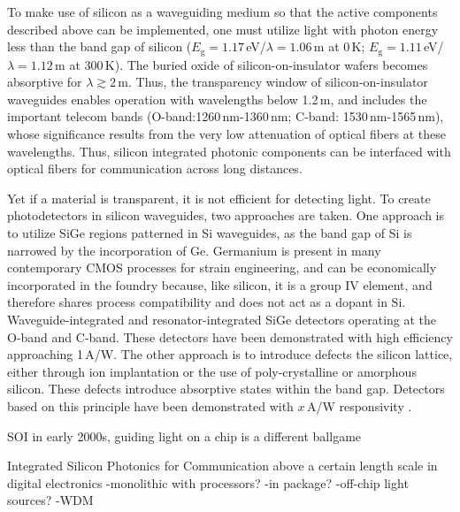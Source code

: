 To make use of silicon as a waveguiding medium so that the active components described above can be implemented, one must utilize light with photon energy less than the band gap of silicon ($E_{\mathrm{g}}=1.17$\,eV/$\lambda = 1.06$\,\textmu m at 0\,K; $E_{\mathrm{g}}=1.11$\,eV/$\lambda = 1.12$\,\textmu m at 300\,K). The buried oxide of silicon-on-insulator wafers becomes absorptive for $\lambda \gtrsim 2$\,\textmu m. Thus, the transparency window of silicon-on-insulator waveguides enables operation with wavelengths below 1.2\,\textmu m, and includes the important telecom bands (O-band:1260\,nm-1360\,nm; C-band: 1530\,nm-1565\,nm), whose significance results from the very low attenuation of optical fibers at these wavelengths. Thus, silicon integrated photonic components can be interfaced with optical fibers for communication across long distances. 

Yet if a material is transparent, it is not efficient for detecting light. To create photodetectors in silicon waveguides, two approaches are taken. One approach is to utilize SiGe regions patterned in Si waveguides, as the band gap of Si is narrowed by the incorporation of Ge. Germanium is present in many contemporary CMOS processes for strain engineering, and can be economically incorporated in the foundry because, like silicon, it is a group IV element, and therefore shares process compatibility and does not act as a dopant in Si. Waveguide-integrated \cite{} and resonator-integrated \cite{} SiGe detectors operating at the O-band and C-band. These detectors have been demonstrated with high efficiency approaching 1\,A/W. The other approach is to introduce defects the silicon lattice, either through ion implantation or the use of poly-crystalline or amorphous silicon. These defects introduce absorptive states within the band gap. Detectors based on this principle have been demonstrated with $x$\,A/W responsivity \cite{meor2014}. 

SOI in early 2000s, guiding light on a chip is a different ballgame

\vspace{3em}
Integrated Silicon Photonics for Communication above a certain length scale in digital electronics
-monolithic with processors?
-in package?
-off-chip light sources?
-WDM



\cite{liyo2018}

